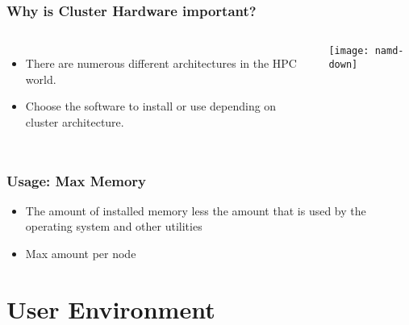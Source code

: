 \documentclass[slidestop,mathserif,compress,xcolor=svgnames,table]{beamer}
\newcommand*\vardiamond{\textcolor{tigerspurple}{%
  \ensuremath{\blacklozenge}}}
\begin{document}
\begin{frame}
\frametitle{\small Why is Cluster Hardware important?} 
\begin{columns}
 \column{5cm}
\begin{itemize}
 \item There are numerous different architectures in the HPC world.
 \item Choose the software to install or use depending on cluster architecture.
\end{itemize}
\column{7cm}
\vspace{-1cm}
\begin{center}
\texttt{[image: namd-down]}
\end{center}
\end{columns}
\end{frame}

\begin{frame}
\frametitle{\small Usage: Max Memory}
\begin{itemize}
\item The amount of installed memory less the amount that is used by the operating system and other utilities 
\item Max amount per node
\end{itemize}
\end{frame}


\section{User Environment}
\end{document}
